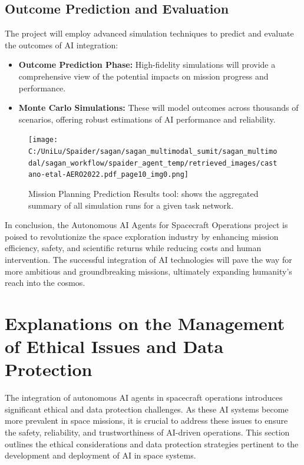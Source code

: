 \documentclass[a4paper, 11pt]{article}
\begin{document}
\subsection{Outcome Prediction and Evaluation}

The project will employ advanced simulation techniques to predict and evaluate the outcomes of AI integration:

\begin{itemize}
    \item \textbf{Outcome Prediction Phase:} High-fidelity simulations will provide a comprehensive view of the potential impacts on mission progress and performance.
    \item \textbf{Monte Carlo Simulations:} These will model outcomes across thousands of scenarios, offering robust estimations of AI performance and reliability.
\end{itemize}

\begin{figure}[htbp]
    \centering
    \texttt{[image: C:/UniLu/Spaider/sagan/sagan\_multimodal\_sumit/sagan\_multimodal/sagan\_workflow/spaider\_agent\_temp/retrieved\_images/castano-etal-AERO2022.pdf\_page10\_img0.png]}
    \caption{Mission Planning Prediction Results tool: shows the aggregated summary of all simulation runs for a given task network.}
    \label{fig:mission-planning-prediction}
\end{figure}

In conclusion, the Autonomous AI Agents for Spacecraft Operations project is poised to revolutionize the space exploration industry by enhancing mission efficiency, safety, and scientific returns while reducing costs and human intervention. The successful integration of AI technologies will pave the way for more ambitious and groundbreaking missions, ultimately expanding humanity's reach into the cosmos.
\section{Explanations on the Management of Ethical Issues and Data Protection}

The integration of autonomous AI agents in spacecraft operations introduces significant ethical and data protection challenges. As these AI systems become more prevalent in space missions, it is crucial to address these issues to ensure the safety, reliability, and trustworthiness of AI-driven operations. This section outlines the ethical considerations and data protection strategies pertinent to the development and deployment of AI in space systems.
\end{document}
